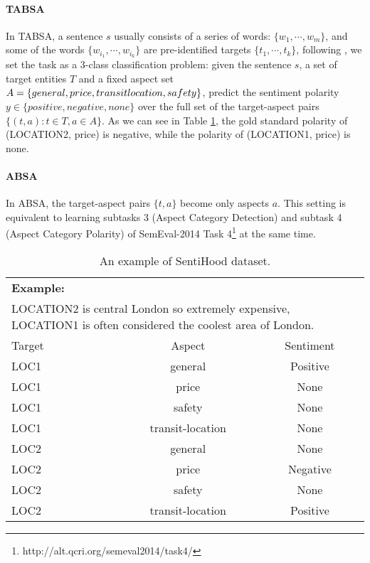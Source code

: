 \documentclass[11pt,a4paper]{article}
\theoremstyle{definition}
\begin{document}
	\paragraph{TABSA}	In TABSA, a sentence $s$ usually consists of a series of words: $\{w_1,\cdots,w_m\}$, and some of the words $\{w_{i_1},\cdots,w_{i_k}\}$ are pre-identified targets $\{t_1,\cdots,t_k\}$, following \citet{saeidi2016sentihood}, we set the task as a 3-class classification problem: given the sentence $s$, a set of target entities $T$ and a fixed aspect set $A=\{general,price,transit\-location,safety\}$, predict the sentiment polarity $y\in\{positive, negative, none\}$ over the full set of the target-aspect pairs $\{(t, a): t \in T, a \in A\}$. As we can see in Table \ref{example}, the gold standard polarity of (LOCATION2, price) is negative, while the polarity of (LOCATION1, price) is none.

	\paragraph{ABSA} In ABSA, the target-aspect pairs $\{t,a\}$ become only aspects $a$. This setting is equivalent to learning subtasks 3 (Aspect Category Detection) and subtask 4 (Aspect Category Polarity) of SemEval-2014 Task 4\footnote{http://alt.qcri.org/semeval2014/task4/} at the same time.

	\begin{table}[ht]
		\centering
		\begin{tabular}{l c c}
			\toprule
            \textbf{Example:}\\
            \multicolumn{3}{p{\linewidth }}{\textcolor[rgb]{1.00,0.00,0.00}{LOCATION2} is central London so extremely expensive, \textcolor[rgb]{0.00,0.00,1.00}{LOCATION1} is often considered the coolest area of London.}\\
            \midrule
            \midrule
			Target & Aspect & Sentiment \\
			\cline{1-3}
			LOC1 & general & Positive \\
			LOC1 & price & None \\
			LOC1 & safety & None \\
			LOC1 & transit-location & None \\
			LOC2 & general & None \\
			LOC2 & price & Negative \\
			LOC2 & safety & None \\
			LOC2 & transit-location & Positive \\
			\bottomrule
		\end{tabular}
	\caption{\label{example} An example of SentiHood dataset.}
	\end{table}
	
\end{document}
